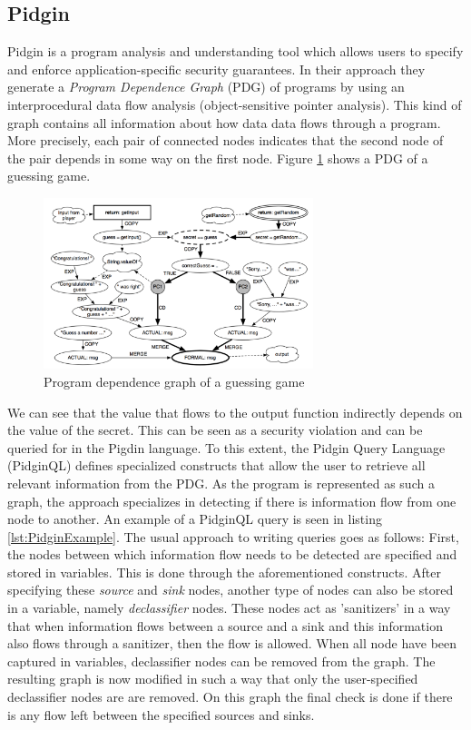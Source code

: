 \subsection*{Pidgin}

Pidgin\cite{PidginQL} is a program analysis and understanding tool which allows users to specify and enforce application-specific security guarantees. In their approach they generate a \textit{Program Dependence Graph} (PDG) of programs by using an interprocedural data flow analysis (object-sensitive pointer analysis). This kind of graph contains all information about how data data flows through a program. More precisely, each pair of connected nodes indicates that the second node of the pair depends in some way on the first node. Figure \ref{fig:PDG} shows a PDG of a guessing game.

\begin{figure}[!ht]
    \centering
      \includegraphics[width=0.7\textwidth]{images/PDG} 
      \caption{Program dependence graph of a guessing game}
    \label{fig:PDG}
\end{figure}

We can see that the value that flows to the output function indirectly depends on the value of the secret. This can be seen as a security violation and can be queried for in the Pigdin language. To this extent, the Pidgin Query Language (PidginQL) defines specialized constructs that allow the user to retrieve all relevant information from the PDG. As the program is represented as such a graph, the approach specializes in detecting if there is information flow from one node to another. An example of a PidginQL query is seen in listing \ref{lst:PidginExample}. The usual approach to writing queries goes as follows: First, the nodes between which information flow needs to be detected are specified and stored in variables. This is done through the aforementioned constructs. After specifying these \textit{source} and \textit{sink} nodes, another type of nodes can also be stored in a variable, namely \textit{declassifier} nodes. These nodes act as 'sanitizers' in a way that when information flows between a source and a sink and this information also flows through a sanitizer, then the flow is allowed. When all node have been captured in variables, declassifier nodes can be removed from the graph. The resulting graph is now modified in such a way that only the user-specified declassifier nodes are are removed. On this graph the final check is done if there is any flow left between the specified sources and sinks. 

